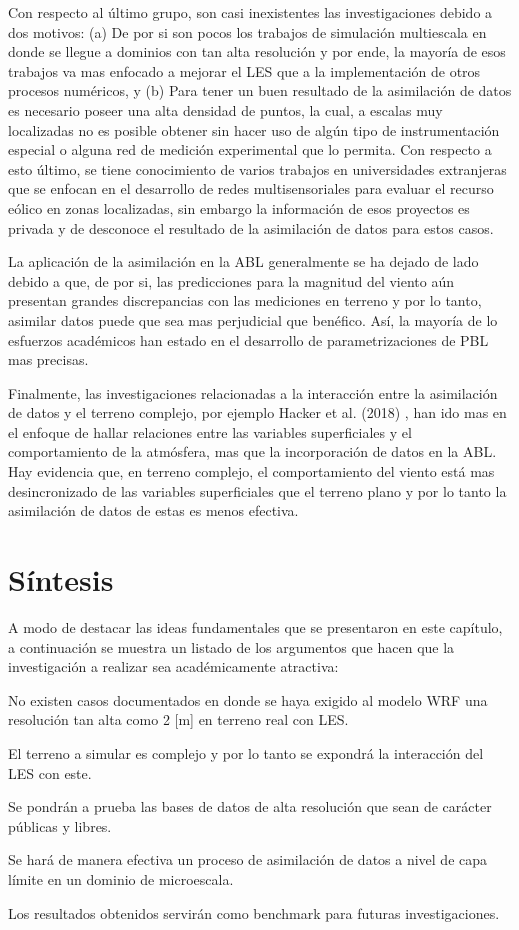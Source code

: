 Con respecto al último grupo, son casi inexistentes las investigaciones debido a dos motivos: (a) De por si son pocos los trabajos de simulación multiescala en donde se llegue a dominios con tan alta resolución y por ende, la mayoría de esos trabajos va mas enfocado a mejorar el LES que a la implementación de otros procesos numéricos, y (b) Para tener un buen resultado de la asimilación de datos es necesario poseer una alta densidad de puntos, la cual, a escalas muy localizadas no es posible obtener sin hacer uso de algún tipo de instrumentación especial o alguna red de medición experimental que lo permita. Con respecto a esto último, se tiene conocimiento de varios trabajos en universidades extranjeras que se enfocan en el desarrollo de redes multisensoriales para evaluar el recurso eólico en zonas localizadas, sin embargo la información de esos proyectos es privada y de desconoce el resultado de la asimilación de datos para estos casos.

La aplicación de la asimilación en la ABL generalmente se ha dejado de lado debido a que, de por si, las predicciones para la magnitud del viento aún presentan grandes discrepancias con las mediciones en terreno y por lo tanto, asimilar datos puede que sea mas perjudicial que benéfico. Así, la mayoría de lo esfuerzos académicos han estado en el desarrollo de parametrizaciones de PBL mas precisas. 

Finalmente, las investigaciones relacionadas a la interacción entre la asimilación de datos y el terreno complejo, por ejemplo Hacker et al. (2018) \cite{hacker2018challenges}, han ido mas en el enfoque de hallar relaciones entre las variables superficiales y el comportamiento de la atmósfera, mas que la incorporación de datos en la ABL. Hay evidencia que, en terreno complejo, el comportamiento del viento está mas desincronizado de las variables superficiales que el terreno plano y por lo tanto la asimilación de datos de estas es menos efectiva.
\newpage
\section{Síntesis}
A modo de destacar las ideas fundamentales que se presentaron en este capítulo, a continuación se muestra un listado de los argumentos que hacen que la investigación a realizar sea académicamente atractiva:
\begin{enumerate*}
	\item No existen casos documentados en donde se haya exigido al modelo WRF una resolución tan alta como 2 [m] en terreno real con LES.
	\item El terreno a simular es complejo y por lo tanto se expondrá la interacción del LES con este.
	\item Se pondrán a prueba las bases de datos de alta resolución que sean de carácter públicas y libres.
	\item Se hará de manera efectiva un proceso de asimilación de datos a nivel de capa límite en un dominio de microescala.
	\item Los resultados obtenidos servirán como benchmark para futuras investigaciones.
\end{enumerate*}

